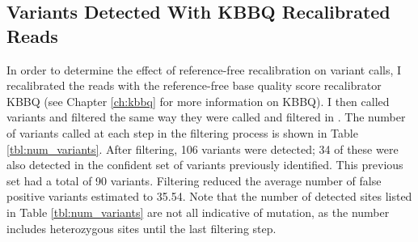 \subsection{Variants Detected With KBBQ Recalibrated Reads}

In order to determine the effect of reference-free recalibration on variant calls, I recalibrated the reads with the reference-free base quality score recalibrator KBBQ (see Chapter \ref{ch:kbbq} for more information on KBBQ). I then called variants and filtered the same way they were called and filtered in \cite{orr_phylogenomic_2020}. The number of variants called at each step in the filtering process is shown in Table \ref{tbl:num_variants}. After filtering, 106 variants were detected; 34 of these were also detected in the confident set of variants previously identified. This previous set had a total of 90 variants. Filtering reduced the average number of false positive variants estimated to 35.54. Note that the number of detected sites listed in Table \ref{tbl:num_variants} are not all indicative of mutation, as the number includes heterozygous sites until the last filtering step.

